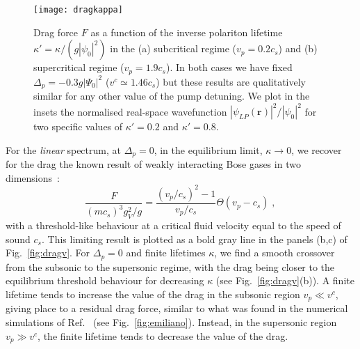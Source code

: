 \begin{figure}[tb]\centering
\texttt{[image: dragkappa]}
\caption{
%
Drag force $F$ as a function of the inverse polariton
lifetime $\kappa'=\kappa/(g |\psi_0|^2)$ in the (a) subcritical regime
($v_p=0.2 c_s$) and (b) supercritical regime ($v_p=1.9 c_s$). In both
cases we have fixed $\Delta_p=-0.3g|\Psi_0|^2$ ($v^c \simeq 1.46 c_s$)
but these results are qualitatively similar for any other value of the
pump detuning. We plot in the insets the normalised real-space
wavefunction $|\psi_{LP}(\bm{r})|^2/|\psi_0|^2$ for two specific
values of $\kappa'=0.2$ and $\kappa'=0.8$.
%
}\label{fig:dragk}
\end{figure}

For the \emph{linear} spectrum, at $\Delta_p=0$, in the equilibrium
limit, $\kappa \to 0$, we recover for the drag the known result of
weakly interacting Bose gases in two
dimensions~\cite{Astrakharchik_2004}:
%
\begin{equation}
  \frac{F}{(mc_s)^3 g_V^2/g}=\frac{(v_p/c_s)^2 - 1}{v_p/c_s}
  \Theta(v_p - c_s)\; ,
\label{eq:drag0}
\end{equation}
%
with a threshold-like behaviour at a critical fluid velocity equal to
the speed of sound $c_s$. This limiting result is plotted as a bold
gray line in the panels (b,c) of Fig.~\ref{fig:dragv}. For
$\Delta_p=0$ and finite lifetimes $\kappa$, we find a smooth crossover
from the subsonic to the supersonic regime, with the drag being closer
to the equilibrium threshold behaviour for decreasing $\kappa$ (see
Fig.~\ref{fig:dragv}(b)). A finite lifetime tends to increase the
value of the drag in the subsonic region $v_p \ll v^c$, giving place
to a residual drag force, similar to what was found in the numerical
simulations of Ref.~\cite{Cancellieri_2010} (see
Fig.~\ref{fig:emiliano}). Instead, in the supersonic region
$v_p \gg v^c$, the finite lifetime tends to decrease the value of the
drag. 


